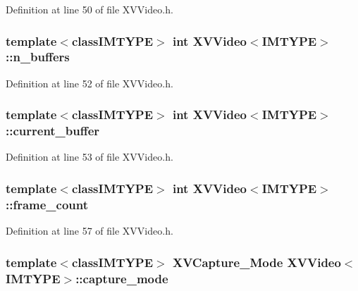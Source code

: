 Definition at line 50 of file XVVideo.h.\label{XVVideo_n3}
\hypertarget{class_XVVideo_n3}{
\subsubsection[n_buffers]{\setlength{\rightskip}{0pt plus 5cm}template$<$classIMTYPE$>$ int XVVideo$<$IMTYPE$>$::n\_\-buffers}}




Definition at line 52 of file XVVideo.h.\label{XVVideo_n4}
\hypertarget{class_XVVideo_n4}{
\subsubsection[current_buffer]{\setlength{\rightskip}{0pt plus 5cm}template$<$classIMTYPE$>$ int XVVideo$<$IMTYPE$>$::current\_\-buffer}}




Definition at line 53 of file XVVideo.h.\label{XVVideo_n5}
\hypertarget{class_XVVideo_n5}{
\subsubsection[frame_count]{\setlength{\rightskip}{0pt plus 5cm}template$<$classIMTYPE$>$ int XVVideo$<$IMTYPE$>$::frame\_\-count}}




Definition at line 57 of file XVVideo.h.\label{XVVideo_n6}
\hypertarget{class_XVVideo_n6}{
\subsubsection[capture_mode]{\setlength{\rightskip}{0pt plus 5cm}template$<$classIMTYPE$>$ XVCapture\_\-Mode XVVideo$<$IMTYPE$>$::capture\_\-mode}}




